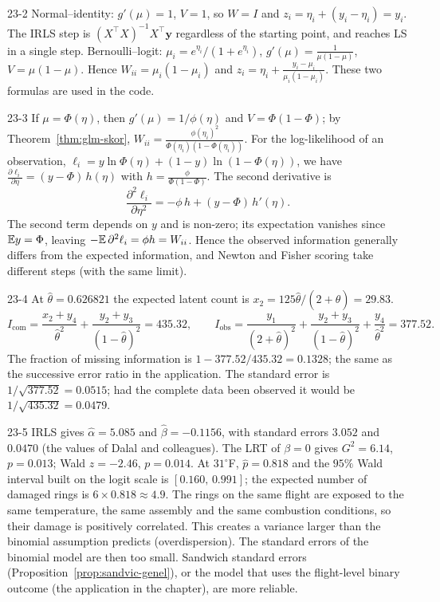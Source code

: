 \begin{solution}{23-2}
Normal--identity: $g'(\mu)=1$, $V=1$, so $W=I$ and $z_i=\eta_i+(y_i-\eta_i)=y_i$. The IRLS step is $(X^\top X)^{-1}X^\top\mathbf y$ regardless of the starting point, and reaches LS in a single step. Bernoulli--logit: $\mu_i=e^{\eta_i}/(1+e^{\eta_i})$, $g'(\mu)=\frac1{\mu(1-\mu)}$, $V=\mu(1-\mu)$. Hence $W_{ii}=\mu_i(1-\mu_i)$ and $z_i=\eta_i+\frac{y_i-\mu_i}{\mu_i(1-\mu_i)}$. These two formulas are used in the code.
\end{solution}

\begin{solution}{23-3}
If $\mu=\Phi(\eta)$, then $g'(\mu)=1/\phi(\eta)$ and $V=\Phi(1-\Phi)$; by Theorem~\ref{thm:glm-skor}, $W_{ii}=\frac{\phi(\eta_i)^2}{\Phi(\eta_i)(1-\Phi(\eta_i))}$. For the log-likelihood of an observation, $\ell_i=y\ln\Phi(\eta)+(1-y)\ln(1-\Phi(\eta))$, we have $\frac{\partial\ell_i}{\partial\eta}=(y-\Phi)\,h(\eta)$ with $h=\frac{\phi}{\Phi(1-\Phi)}$. The second derivative is
\[
\frac{\partial^2\ell_i}{\partial\eta^2}=-\phi\,h+(y-\Phi)\,h'(\eta) .
\]
The second term depends on $y$ and is non-zero; its expectation vanishes since $\mathbb{E} y=\Phi$, leaving $-\mathbb{E}\,\partial^2\ell_i=\phi h=W_{ii}$. Hence the observed information generally differs from the expected information, and Newton and Fisher scoring take different steps (with the same limit).
\end{solution}

\begin{solution}{23-4}
At $\hat\theta=0.626821$ the expected latent count is $x_2=125\hat\theta/(2+\hat\theta)=29.83$.
\[
I_{\text{com}}=\frac{x_2+y_4}{\hat\theta^2}+\frac{y_2+y_3}{(1-\hat\theta)^2}=435.32,\qquad
I_{\text{obs}}=\frac{y_1}{(2+\hat\theta)^2}+\frac{y_2+y_3}{(1-\hat\theta)^2}+\frac{y_4}{\hat\theta^2}=377.52 .
\]
The fraction of missing information is $1-377.52/435.32=0.1328$; the same as the successive error ratio in the application. The standard error is $1/\sqrt{377.52}=0.0515$; had the complete data been observed it would be $1/\sqrt{435.32}=0.0479$.
\end{solution}

\begin{solution}{23-5}
IRLS gives $\hat\alpha=5.085$ and $\hat\beta=-0.1156$, with standard errors $3.052$ and $0.0470$ (the values of Dalal and colleagues). The LRT of $\beta=0$ gives $G^2=6.14$, $p=0.013$; Wald $z=-2.46$, $p=0.014$. At $31^\circ$F, $\hat p=0.818$ and the $95\%$ Wald interval built on the logit scale is $[0.160,\,0.991]$; the expected number of damaged rings is $6\times0.818\approx4.9$. The rings on the same flight are exposed to the same temperature, the same assembly and the same combustion conditions, so their damage is positively correlated. This creates a variance larger than the binomial assumption predicts (overdispersion). The standard errors of the binomial model are then too small. Sandwich standard errors (Proposition~\ref{prop:sandvic-genel}), or the model that uses the flight-level binary outcome (the application in the chapter), are more reliable.
\end{solution}
